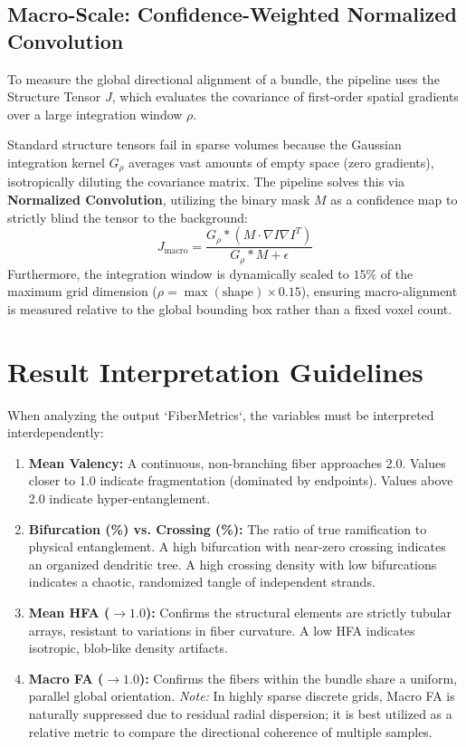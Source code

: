 \documentclass[11pt, a4paper]{article}
\begin{document}
\subsection{Macro-Scale: Confidence-Weighted Normalized Convolution}
To measure the global directional alignment of a bundle, the pipeline uses the Structure Tensor $J$, which evaluates the covariance of first-order spatial gradients over a large integration window $\rho$. 

Standard structure tensors fail in sparse volumes because the Gaussian integration kernel $G_\rho$ averages vast amounts of empty space (zero gradients), isotropically diluting the covariance matrix. The pipeline solves this via \textbf{Normalized Convolution}, utilizing the binary mask $M$ as a confidence map to strictly blind the tensor to the background:
\begin{equation}
    J_{\text{macro}} = \frac{G_\rho * \left( M \cdot \nabla I \nabla I^T \right)}{G_\rho * M + \epsilon}
\end{equation}
Furthermore, the integration window is dynamically scaled to $15\%$ of the maximum grid dimension ($\rho = \max(\text{shape}) \times 0.15$), ensuring macro-alignment is measured relative to the global bounding box rather than a fixed voxel count. 

\section{Result Interpretation Guidelines}
When analyzing the output `FiberMetrics`, the variables must be interpreted interdependently:

\begin{enumerate}
    \item \textbf{Mean Valency:} A continuous, non-branching fiber approaches 2.0. Values closer to 1.0 indicate fragmentation (dominated by endpoints). Values above 2.0 indicate hyper-entanglement.
    \item \textbf{Bifurcation (\%) vs. Crossing (\%):} The ratio of true ramification to physical entanglement. A high bifurcation with near-zero crossing indicates an organized dendritic tree. A high crossing density with low bifurcations indicates a chaotic, randomized tangle of independent strands.
    \item \textbf{Mean HFA ($\rightarrow 1.0$):} Confirms the structural elements are strictly tubular arrays, resistant to variations in fiber curvature. A low HFA indicates isotropic, blob-like density artifacts.
    \item \textbf{Macro FA ($\rightarrow 1.0$):} Confirms the fibers within the bundle share a uniform, parallel global orientation. \textit{Note:} In highly sparse discrete grids, Macro FA is naturally suppressed due to residual radial dispersion; it is best utilized as a relative metric to compare the directional coherence of multiple samples.
\end{enumerate}
\end{document}
